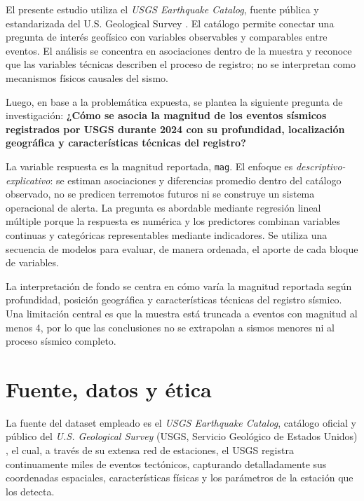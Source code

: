 \documentclass{style}
\newcommand{\var}[1]{\texttt{#1}}
\begin{document}
El presente estudio utiliza el \textit{USGS Earthquake Catalog}, fuente pública y estandarizada del U.S. Geological Survey \cite{usgs}. El catálogo permite conectar una pregunta de interés geofísico con variables observables y comparables entre eventos. El análisis se concentra en asociaciones dentro de la muestra y reconoce que las variables técnicas describen el proceso de registro; no se interpretan como mecanismos físicos causales del sismo.

Luego, en base a la problemática expuesta, se plantea la siguiente pregunta de investigación: \textbf{¿Cómo se asocia la magnitud de los eventos sísmicos registrados por USGS durante 2024 con su profundidad, localización geográfica y características técnicas del registro?}

La variable respuesta es la magnitud reportada, \var{mag}. El enfoque es \textit{descriptivo-explicativo}: se estiman asociaciones y diferencias promedio dentro del catálogo observado, no se predicen terremotos futuros ni se construye un sistema operacional de alerta. La pregunta es abordable mediante regresión lineal múltiple porque la respuesta es numérica y los predictores combinan variables continuas y categóricas representables mediante indicadores. Se utiliza una secuencia de modelos para evaluar, de manera ordenada, el aporte de cada bloque de variables.

La interpretación de fondo se centra en cómo varía la magnitud reportada según profundidad, posición geográfica y características técnicas del registro sísmico. Una limitación central es que la muestra está truncada a eventos con magnitud al menos 4, por lo que las conclusiones no se extrapolan a sismos menores ni al proceso sísmico completo.



\section{Fuente, datos y ética}

La fuente del dataset empleado es el \textit{USGS Earthquake Catalog}, catálogo oficial y público del \textit{U.S. Geological Survey} (USGS, Servicio Geológico de Estados Unidos)
\cite{usgs}, el cual, a través de su extensa red de estaciones, el USGS registra continuamente miles de eventos tectónicos, capturando detalladamente sus coordenadas espaciales, características físicas y los parámetros de la estación que los detecta. 
\end{document}
